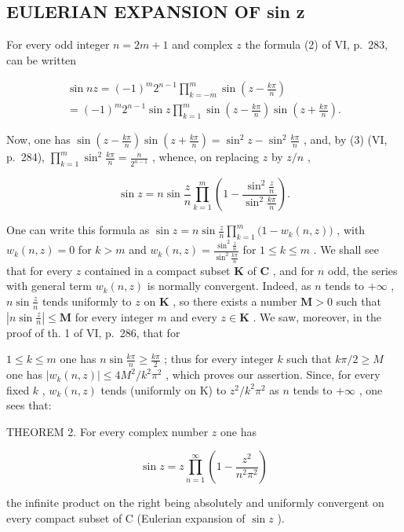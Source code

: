 \subsection{EULERIAN EXPANSION OF sin z}

For every odd integer \(n = 2m + 1\) and complex \(z\) the formula (2) of VI, p.~283, can be written

\[
\begin{array}{l} \sin n z = (- 1) ^ {m}   2 ^ {n - 1}   \prod_ {k = - m} ^ {m}   \sin \left(z - \frac {k \pi}{n}\right) \\ = (- 1) ^ {m}   2 ^ {n - 1}   \sin z   \prod_ {k = 1} ^ {m}   \sin \left(z - \frac {k \pi}{n}\right) \sin \left(z + \frac {k \pi}{n}\right). \end{array}
\]

Now, one has \(\sin\left(z-\frac{k\pi}{n}\right)\sin\left(z+\frac{k\pi}{n}\right)=\sin^{2}z-\sin^{2}\frac{k\pi}{n}\) , and, by (3) (VI, p.~284), \(\prod_{k=1}^{m}\sin^{2}\frac{k\pi}{n}=\frac{n}{2^{n-1}}\) , whence, on replacing \(z\) by \(z/n\) ,

\[
\sin z = n \sin \frac {z}{n} \prod_ {k = 1} ^ {m} \left(1 - \frac {\sin^ {2} \frac {z}{n}}{\sin^ {2} \frac {k \pi}{n}}\right).\tag{9}
\]

One can write this formula as \(\sin z = n\sin \frac{z}{n}\prod_{k = 1}^{m}\big(1 - w_k(n,z)\big)\) , with \(w_{k}(n,z) = 0\) for \(k > m\) and \(w_{k}(n,z) = \frac{\sin^{2}\frac{z}{n}}{\sin^{2}\frac{k\pi}{n}}\) for \(1\leqslant k\leqslant m\) . We shall see that for every \(z\) contained in a compact subset \(\mathbf{K}\) of \(\mathbf{C}\) , and for \(n\) odd, the series with general term \(w_{k}(n,z)\) is normally convergent. Indeed, as \(n\) tends to \(+\infty\) , \(n\sin \frac{z}{n}\) tends uniformly to \(z\) on \(\mathbf{K}\) , so there exists a number \(\mathbf{M} > 0\) such that \(\left|n\sin \frac{z}{n}\right|\leqslant \mathbf{M}\) for every integer \(m\) and every \(z\in \mathbf{K}\) . We saw, moreover, in the proof of th. 1 of VI, p.~286, that for

\(1 \leqslant k \leqslant m\) one has \(n \sin \frac{k\pi}{n} \geqslant \frac{k\pi}{2}\) ; thus for every integer \(k\) such that \(k\pi/2 \geqslant M\) one has \(|w_k(n, z)| \leqslant 4M^2/k^2\pi^2\) , which proves our assertion. Since, for every fixed \(k\) , \(w_k(n, z)\) tends (uniformly on K) to \(z^2/k^2\pi^2\) as \(n\) tends to \(+\infty\) , one sees that:

THEOREM 2. For every complex number \(z\) one has

\[
\sin z = z \prod_ {n = 1} ^ {\infty} \left(1 - \frac {z ^ {2}}{n ^ {2} \pi^ {2}}\right)\tag{10}
\]

the infinite product on the right being absolutely and uniformly convergent on every compact subset of C (Eulerian expansion of \(\sin z\) ).

